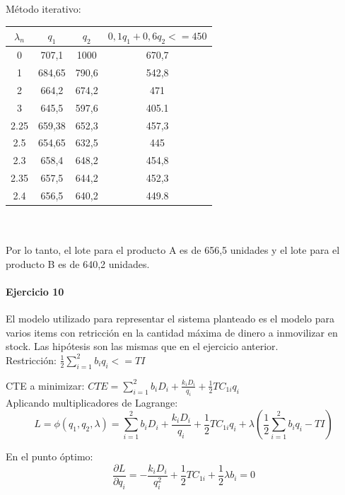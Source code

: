 \documentclass[a4paper,10pt]{article}
\begin{document}
Método iterativo:\\ 
    \begin{tabular}{|| c | c | c | c ||}
    \hline 
      $\lambda_n$ & $q_1$ & $q_2$ &  	$0,1 q_1 + 0,6 q_2 <= 450 $\\ \hline \hline
     0 & 707,1 & 1000 & 670,7	\\ \hline
     1 & 684,65 & 790,6 & 542,8	\\ \hline
     2 & 664,2 & 674,2               &  471 \\ \hline
3 & 645,5 & 597,6               & 405.1  \\ \hline     
     2.25 & 659,38 & 652,3               &  457,3 \\ \hline
     2.5 & 654,65 & 632,5               &  445 \\ \hline
     2.3 & 658,4 & 648,2               &  454,8 \\ \hline 
     2.35 & 657,5 & 644,2               &  452,3 \\ \hline 
     2.4 & 656,5 & 640,2               &  449.8 \\ \hline 
    \end{tabular}
\\ \\ 
Por lo tanto, el lote para el producto A es de 656,5 unidades y el lote para el producto B es de 640,2 unidades.

\paragraph{Ejercicio 10}
    El modelo utilizado para representar el sistema planteado es el modelo para varios items con retricción en la 
cantidad máxima de dinero a inmovilizar en stock. Las hipótesis son las mismas que en el ejercicio anterior.  \\

 Restricción:  $ \frac{1}{2} \sum_{i=1}^{2} b_i q_i <= TI $ 

CTE a minimizar: $ CTE = \sum_{i=1}^{2} b_i D_i + \frac{k_i D_i}{q_i} + \frac{1}{2} T C_{1i} q_i $ \\

Aplicando multiplicadores de Lagrange:
	$$ L = \phi(q_1,q_2,\lambda) = \sum_{i=1}^{2} b_i D_i + \frac{k_i D_i}{q_i} + \frac{1}{2} T C_{1i} q_i +
	\lambda ( \frac{1}{2} \sum_{i=1}^{2} b_i q_i - TI ) $$

En el punto óptimo:
$$\frac{\partial L } {\partial q_i }   = -  \frac{ k_i D_i}{q_i^2}  + \frac{1}{2} T C_{1i} + \frac{1}{2} \lambda b_i = 0$$
\end{document}
